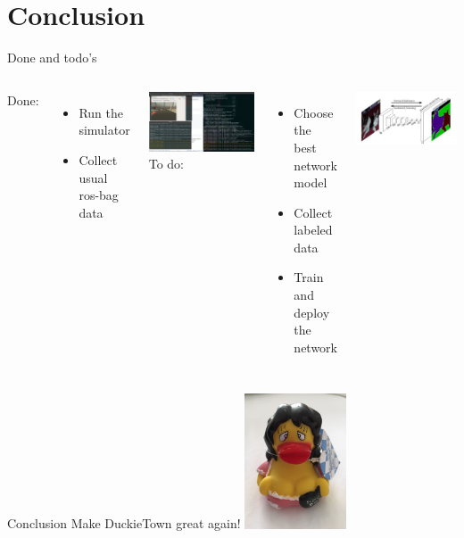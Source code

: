 \documentclass{beamer}
\begin{document}
\section{Conclusion}
\begin{frame}{Done and todo's}
    \begin{columns}
        Done:
        \begin{itemize}
            \item Run the simulator
            \item Collect usual ros-bag data
        \end{itemize}
        \includegraphics[width=\textwidth]{fig/example.jpg}
        To do:
        \begin{itemize}
            \item Choose the best network model
            \item Collect labeled data
            \item Train and deploy the network
        \end{itemize}
        \includegraphics[width=\textwidth]{fig/semantic_arch.jpeg}
    \end{columns}
\end{frame}
\begin{frame}{Conclusion}
    \Huge \center Make DuckieTown great again!
    \includegraphics[height=4cm]{fig/duckie.jpg}
\end{frame}
\end{document}
